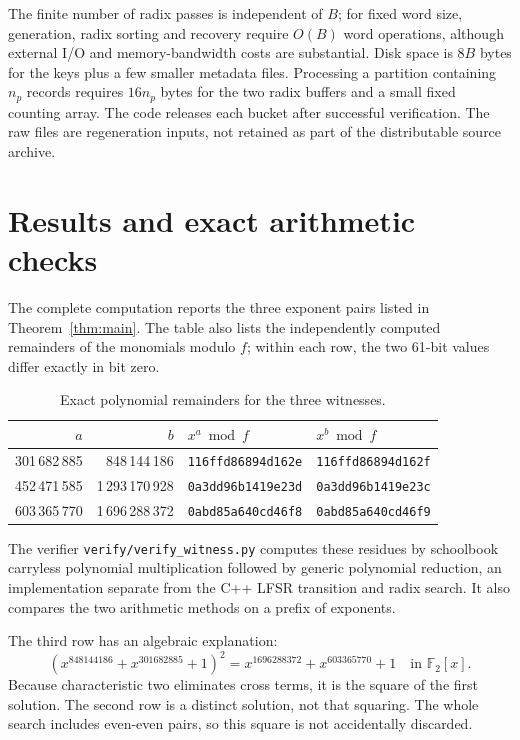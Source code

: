 \documentclass[11pt,a4paper]{article}
\newcommand{\F}{\mathbb F}
\begin{document}
The finite number of radix passes is independent of \(B\); for fixed
word size, generation, radix sorting and recovery require \(O(B)\)
word operations, although external I/O and memory-bandwidth costs are
substantial. Disk space is \(8B\) bytes for the keys plus a few
smaller metadata files. Processing a partition containing \(n_p\)
records requires \(16n_p\) bytes for the two radix buffers and a small
fixed counting array. The code releases each bucket after successful
verification. The raw files are regeneration inputs, not retained as
part of the distributable source archive.

\section{Results and exact arithmetic checks}\label{sec:results}
The complete computation reports the three exponent pairs listed in
Theorem~\ref{thm:main}. The table also lists the independently computed
remainders of the monomials modulo \(f\); within each row, the two
61-bit values differ exactly in bit zero.
\begin{table}[H]
\centering\small
\caption{Exact polynomial remainders for the three witnesses.}
\label{tab:witnesses}
\begin{tabular}{@{}r r l l@{}}\toprule
$a$ & $b$ & $x^a\bmod f$ & $x^b\bmod f$\\\midrule
301\,682\,885 & 848\,144\,186 & \texttt{116ffd86894d162e} & \texttt{116ffd86894d162f}\\
452\,471\,585 & 1\,293\,170\,928 & \texttt{0a3dd96b1419e23d} & \texttt{0a3dd96b1419e23c}\\
603\,365\,770 & 1\,696\,288\,372 & \texttt{0abd85a640cd46f8} & \texttt{0abd85a640cd46f9}\\\bottomrule
\end{tabular}
\end{table}
The verifier \texttt{verify/verify\_witness.py} computes these residues
by schoolbook carryless polynomial multiplication followed by generic
polynomial reduction, an implementation separate from the C++ LFSR
transition and radix search. It also compares the two arithmetic
methods on a prefix of exponents.

The third row has an algebraic explanation:
\begin{equation}\label{eq:square}
 (x^{848144186}+x^{301682885}+1)^2
 =x^{1696288372}+x^{603365770}+1
 \quad\text{in }\F_2[x].
\end{equation}
Because characteristic two eliminates cross terms, it is the square of
the first solution. The second row is a distinct solution, not that
squaring. The whole search includes even-even pairs, so this square is
not accidentally discarded.
\end{document}
